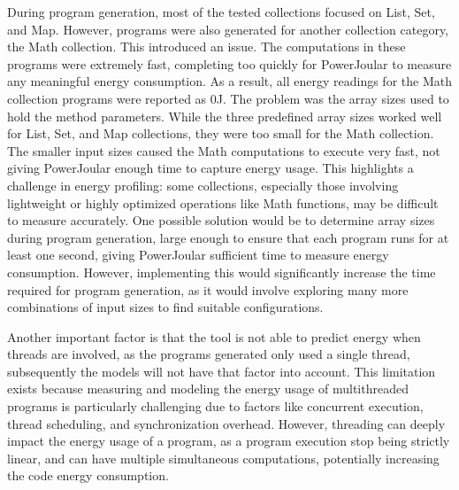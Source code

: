 During program generation, most of the tested collections focused on List, Set, and Map. However, programs were also generated for another collection category, the Math collection. This introduced an issue. The computations in these programs were extremely fast, completing too quickly for PowerJoular to measure any meaningful energy consumption. As a result, all energy readings for the Math collection programs were reported as 0J.
The problem was the array sizes used to hold the method parameters. While the three predefined array sizes worked well for List, Set, and Map collections, they were too small for the Math collection. The smaller input sizes caused the Math computations to execute very fast, not giving PowerJoular enough time to capture energy usage.
This highlights a challenge in energy profiling: some collections, especially those involving lightweight or highly optimized operations like Math functions, may be difficult to measure accurately. One possible solution would be to determine array sizes during program generation, large enough to ensure that each program runs for at least one second, giving PowerJoular sufficient time to measure energy consumption. However, implementing this would significantly increase the time required for program generation, as it would involve exploring many more combinations of input sizes to find suitable configurations.


Another important factor is that the tool is not able to predict energy when threads are involved, as the programs generated only used a single thread, subsequently the models will not have that factor into account. This limitation exists because measuring and modeling the energy usage of multithreaded programs is particularly challenging due to factors like concurrent execution, thread scheduling, and synchronization overhead. However, threading can deeply impact the energy usage of a program, as a program execution stop being strictly linear, and can have multiple simultaneous computations, potentially increasing the code energy consumption.





